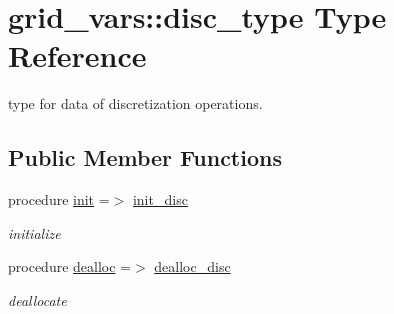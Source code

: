 \hypertarget{structgrid__vars_1_1disc__type}{}\section{grid\+\_\+vars\+:\+:disc\+\_\+type Type Reference}
\label{structgrid__vars_1_1disc__type}


type for data of discretization operations.  


\subsection*{Public Member Functions}
\begin{DoxyCompactItemize}
\item 
procedure \hyperlink{structgrid__vars_1_1disc__type_ac6705a79ae1e5b6e8b5c9b7c34dfd7d6}{init} =$>$ \hyperlink{namespacegrid__vars_afdfc8ea2f4eb94d17c77f805dbe967b7}{init\+\_\+disc}
\begin{DoxyCompactList}\small\item\em initialize \end{DoxyCompactList}\item 
procedure \hyperlink{structgrid__vars_1_1disc__type_afac4991125df4659876e58eb66ee3b10}{dealloc} =$>$ \hyperlink{namespacegrid__vars_a8cacd2260e71a0592c4807698471490f}{dealloc\+\_\+disc}
\begin{DoxyCompactList}\small\item\em deallocate \end{DoxyCompactList}\end{DoxyCompactItemize}
